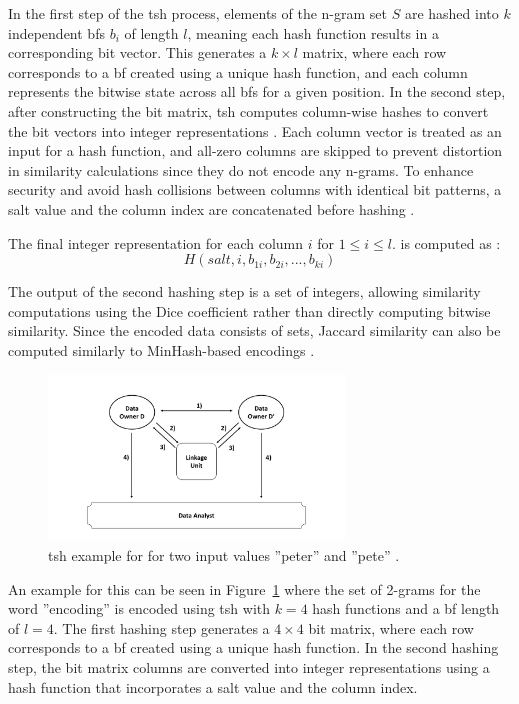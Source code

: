 In the first step of the \ac{tsh} process, elements of the n-gram set \(S\) are hashed into \(k\) independent \ac{bf}s \(b_i\) of length \(l\), meaning each hash function results in a corresponding bit vector.
This generates a \(k \times l\) matrix, where each row corresponds to a \ac{bf} created using a unique hash function, and each column represents the bitwise state across all \ac{bf}s for a given position.
In the second step, after constructing the bit matrix, \ac{tsh} computes column-wise hashes to convert the bit vectors into integer representations .
Each column vector is treated as an input for a hash function, and all-zero columns are skipped to prevent distortion in similarity calculations since they do not encode any n-grams.
To enhance security and avoid hash collisions between columns with identical bit patterns, a salt value and the column index are concatenated before hashing \cite{ranbaduge2020secure}.

The final integer representation for each column $i$ for $1 \leq i \leq l$. is computed as \cite{schaefer2024, ranbaduge2020secure}:
\begin{equation}
    H(salt, i, b_{1i}, b_{2i}, ..., b_{ki})
\end{equation}

The output of the second hashing step is a set of integers, allowing similarity computations using the Dice coefficient rather than directly computing bitwise similarity.
Since the encoded data consists of sets, Jaccard similarity can also be computed similarly to MinHash-based encodings \cite{ranbaduge2020secure}.

\begin{figure}[H]
  \centering
  \includegraphics[width=0.7\textwidth, page=8]{img/visualization.pdf}
  \caption{\ac{tsh} example for for two input values ''peter'' and ''pete'' \cite{ranbaduge2020secure}.}
  \label{fig:tshexample}
\end{figure}

An example for this can be seen in Figure~\ref{fig:tshexample} where the set of 2-grams for the word ''encoding'' is encoded using \ac{tsh} with $k = 4$ hash functions and a \ac{bf} length of $l = 4$.
The first hashing step generates a $4 \times 4$ bit matrix, where each row corresponds to a \ac{bf} created using a unique hash function.
In the second hashing step, the bit matrix columns are converted into integer representations using a hash function that incorporates a salt value and the column index.


